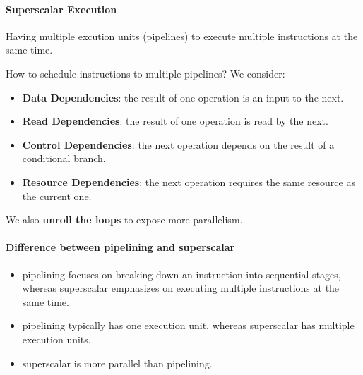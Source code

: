 \documentclass{../../ainote}
\begin{document}
\paragraph{Superscalar Execution}\mbox{}
Having multiple excution units (pipelines) to execute multiple instructions at the same time.

How to schedule instructions to multiple pipelines? We consider:
\begin{itemize}
    \item \textbf{Data Dependencies}: the result of one operation is an input to the next.
    \item \textbf{Read Dependencies}: the result of one operation is read by the next.
    \item \textbf{Control Dependencies}: the next operation depends on the result of a conditional branch.
    \item \textbf{Resource Dependencies}: the next operation requires the same resource as the current one.
\end{itemize}

We also \textbf{unroll the loops} to expose more parallelism.

\paragraph{Difference between pipelining and superscalar}\mbox{}
\begin{itemize}
    \item pipelining focuses on breaking down an instruction into sequential stages, whereas superscalar emphasizes on executing multiple instructions at the same time.
    \item pipelining typically has one execution unit, whereas superscalar has multiple execution units.
    \item superscalar is more parallel than pipelining.
\end{itemize}
\end{document}
